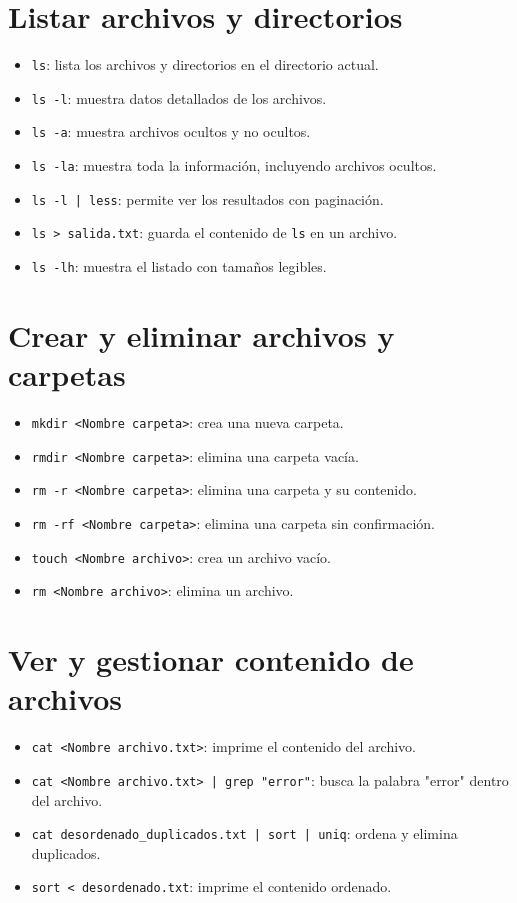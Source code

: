 \documentclass{article}
\begin{document}
\section{Listar archivos y directorios}
\begin{itemize}
    \item \texttt{ls}: lista los archivos y directorios en el directorio actual.
    \item \texttt{ls -l}: muestra datos detallados de los archivos.
    \item \texttt{ls -a}: muestra archivos ocultos y no ocultos.
    \item \texttt{ls -la}: muestra toda la información, incluyendo archivos ocultos.
    \item \texttt{ls -l | less}: permite ver los resultados con paginación.
    \item \texttt{ls > salida.txt}: guarda el contenido de \texttt{ls} en un archivo.
    \item \texttt{ls -lh}: muestra el listado con tamaños legibles.
\end{itemize}

\section{Crear y eliminar archivos y carpetas}
\begin{itemize}
    \item \texttt{mkdir <Nombre carpeta>}: crea una nueva carpeta.
    \item \texttt{rmdir <Nombre carpeta>}: elimina una carpeta vacía.
    \item \texttt{rm -r <Nombre carpeta>}: elimina una carpeta y su contenido.
    \item \texttt{rm -rf <Nombre carpeta>}: elimina una carpeta sin confirmación.
    \item \texttt{touch <Nombre archivo>}: crea un archivo vacío.
    \item \texttt{rm <Nombre archivo>}: elimina un archivo.
\end{itemize}

\section{Ver y gestionar contenido de archivos}
\begin{itemize}
    \item \texttt{cat <Nombre archivo.txt>}: imprime el contenido del archivo.
    \item \texttt{cat <Nombre archivo.txt> | grep "error"}: busca la palabra "error" dentro del archivo.
    \item \texttt{cat desordenado\_duplicados.txt | sort | uniq}: ordena y elimina duplicados.
    \item \texttt{sort < desordenado.txt}: imprime el contenido ordenado.
\end{itemize}
\end{document}
